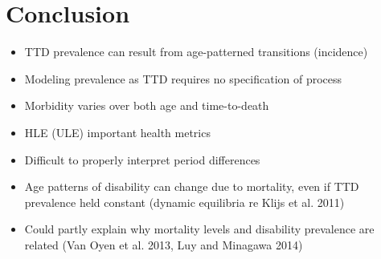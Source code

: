 \documentclass[20pt]{beamer}
\begin{document}
\section{Conclusion}

\begin{frame}[plain]
\Large
\begin{itemize}[<+->]
\item TTD prevalence can result from age-patterned transitions (incidence)
\item Modeling prevalence as TTD requires no specification of process
\item Morbidity varies over both age and time-to-death
\end{itemize}
\end{frame}
\begin{frame}[plain]
\Large
\begin{itemize}[<+->]
\item HLE (ULE) important health metrics
\item Difficult to properly interpret period differences 
\item Age patterns of disability can change due to mortality, even if TTD prevalence held constant (dynamic equilibria re Klijs et al. 2011)
\item Could partly explain why mortality levels and disability prevalence are related (Van Oyen et al. 2013, Luy and Minagawa 2014)
\end{itemize}
\end{frame}



%
\end{document}
